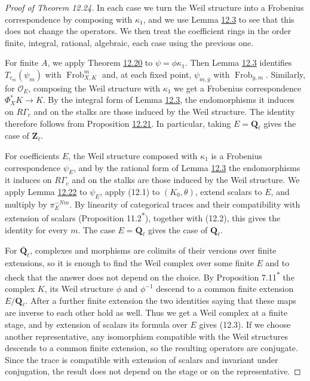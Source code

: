 \documentclass[11pt]{article}
\newcommand{\bpout}[1]{#1\textsuperscript{\hyperlink{bp-outside}{\ensuremath{\ast}}}}
\begin{document}
\begin{proof}[{Proof of Theorem 12.24}]\label{bp75}%
In each case we turn the Weil structure into a Frobenius correspondence by composing with \(\kappa_1\), and we use Lemma \hyperref[bp9]{12.3} to see that this does not change the operators. We then treat the coefficient rings in the order finite, integral, rational, algebraic, each case using the previous one.

For finite \(A\), we apply Theorem \hyperref[bp62]{12.20} to \(\psi=\phi\kappa_1\). Then Lemma \hyperref[bp9]{12.3} identifies \(T_{c_m}(\psi_m)\) with \(\operatorname{Frob}_{X,K}^m\) and, at each fixed point, \(\psi_{m,\bar y}\) with \(\operatorname{Frob}_{y,m}\). Similarly, for \(\mathcal O_E\), composing the Weil structure with \(\kappa_1\) we get a Frobenius correspondence \(\Phi_X^*K\to K\). By the integral form of Lemma \hyperref[bp9]{12.3}, the endomorphisms it induces on \(R\Gamma_c\) and on the stalks are those induced by the Weil structure. The identity therefore follows from Proposition \hyperref[bp66]{12.21}. In particular, taking \(E=\mathbf Q_\ell\) gives the case of \(\mathbf Z_\ell\).

For coefficients \(E\), the Weil structure composed with \(\kappa_1\) is a Frobenius correspondence \(\psi_E\), and by the rational form of Lemma \hyperref[bp9]{12.3} the endomorphisms it induces on \(R\Gamma_c\) and on the stalks are those induced by the Weil structure. We apply Lemma \hyperref[bp69]{12.22} to \(\psi_E\), apply (12.1) to \((K_0,\theta)\), extend scalars to \(E\), and multiply by \(\pi_E^{-Nm}\). By linearity of categorical traces and their compatibility with extension of scalars (Proposition \bpout{11.2}), together with (12.2), this gives the identity for every \(m\). The case \(E=\mathbf Q_\ell\) gives the case of \(\mathbf Q_\ell\).

For \(\overline{\mathbf Q}_\ell\), complexes and morphisms are colimits of their versions over finite extensions, so it is enough to find the Weil complex over some finite \(E\) and to check that the answer does not depend on the choice. By Proposition \bpout{7.11} the complex \(K\), its Weil structure \(\phi\) and \(\phi^{-1}\) descend to a common finite extension \(E/\mathbf Q_\ell\). After a further finite extension the two identities saying that these maps are inverse to each other hold as well. Thus we get a Weil complex at a finite stage, and by extension of scalars its formula over \(E\) gives (12.3). If we choose another representative, any isomorphism compatible with the Weil structures descends to a common finite extension, so the resulting operators are conjugate. Since the trace is compatible with extension of scalars and invariant under conjugation, the result does not depend on the stage or on the representative.


\end{proof}
\end{document}
